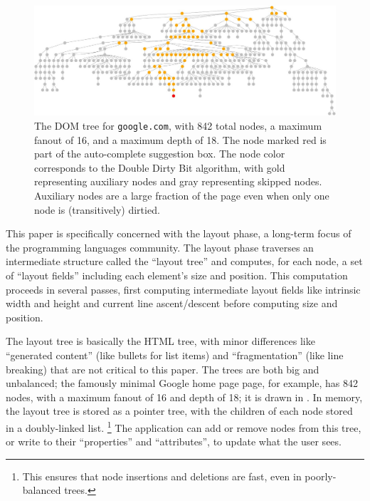 \begin{figure}[tbp]
\includegraphics[scale=0.3]{tree.jpg}
\caption{The DOM tree for \texttt{google.com}, with 842 total nodes, a maximum fanout of 16, and a maximum depth of 18. The node marked red is part of the auto-complete suggestion box. The node color corresponds to the Double Dirty Bit algorithm, with gold representing auxiliary nodes and gray representing skipped nodes. Auxiliary nodes are a large fraction of the page even when only one node is (transitively) dirtied.
}
\label{fig:google}
\end{figure}

This paper is specifically concerned with the layout phase,
  a long-term focus of the programming languages community.
The layout phase traverses an intermediate structure
  called the ``layout tree'' and computes, for each node,
  a set of ``layout fields''
  including each element's size and position.
This computation proceeds in several passes,
  first computing intermediate layout fields
  like intrinsic width and height
  and current line ascent/descent
  before computing size and position.

The layout tree is basically the HTML tree,
  with minor differences like
  ``generated content'' (like bullets for list items)
  and ``fragmentation'' (like line breaking)
  that are not critical to this paper.
The trees are both big and unbalanced;
  the famously minimal Google home page page, for example,
  has 842 nodes, with a maximum fanout of 16 and depth of 18;
  it is drawn in .
In memory, the layout tree is stored as a pointer tree,
  with the children of each node stored in a doubly-linked list.%
\footnote{
This ensures that node insertions and deletions are fast,
  even in poorly-balanced trees.
}
The application can add or remove nodes from this tree,
  or write to their ``properties'' and ``attributes'',
  to update what the user sees.

